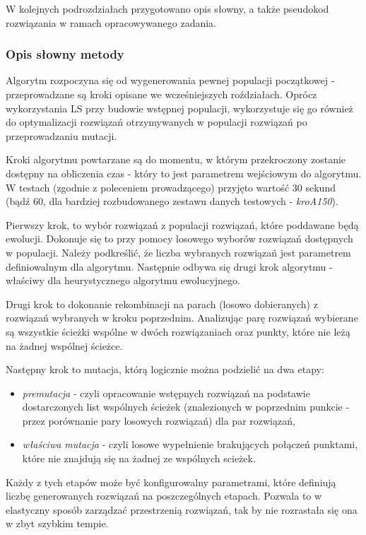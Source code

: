 \documentclass{article}
\begin{document}
W kolejnych podrozdziałach przygotowano opis słowny, a także pseudokod rozwiązania w ramach opracowywanego zadania. 

\subsubsection{Opis słowny metody}
Algorytm rozpoczyna się od wygenerowania pewnej populacji początkowej - przeprowadzane są kroki opisane we wcześniejszych roździałach. Oprócz wykorzystania LS przy budowie wstępnej populacji, wykorzystuje się go również do optymalizacji rozwiązań otrzymywanych w populacji rozwiązań po przeprowadzaniu mutacji.

Kroki algorytmu powtarzane są do momentu, w którym przekroczony zostanie dostępny na obliczenia czas - który to jest parametrem wejściowym do algorytmu. W testach (zgodnie z poleceniem prowadzącego) przyjęto wartość 30 sekund (bądź 60, dla bardziej rozbudowanego zestawu danych testowych - \emph{kroA150}). 

Pierwszy krok, to wybór rozwiązań z populacji rozwiązań, które poddawane będą ewolucji. Dokonuje się to przy pomocy losowego wyborów rozwiązań dostępnych w populacji. Należy podkreślić, że liczba wybranych rozwiązań jest parametrem definiowalnym dla algorytmu. Następnie odbywa się drugi krok algorytmu - właściwy dla heurystycznego algorytmu ewolucyjnego.

Drugi krok to dokonanie rekombinacji na parach (losowo dobieranych) z rozwiązań wybranych w kroku poprzednim. Analizując parę rozwiązań wybierane są wszystkie ścieżki wspólne w dwóch rozwiązaniach oraz punkty, które nie leżą na żadnej wspólnej ścieżce. 

Następny krok to mutacja, którą logicznie można podzielić na dwa etapy:
	\begin{itemize}
		\item \emph{premutacja} - czyli opracowanie wstępnych rozwiązań na podstawie dostarczonych list wspólnych ścieżek (znalezionych w poprzednim punkcie - przez porównanie pary losowych rozwiązań) dla par rozwiązań,
		\item \emph{właściwa mutacja} - czyli losowe wypełnienie brakujących połączeń punktami, które nie znajdują się na żadnej ze wspólnych scieżek.
	\end{itemize}
	
Każdy z tych etapów może być konfigurowalny parametrami, które definiują liczbę generowanych rozwiązań na poszczególnych etapach. Pozwala to w elastyczny sposób zarządzać przestrzenią rozwiązań, tak by nie rozrastała się ona w zbyt szybkim tempie.
\end{document}
